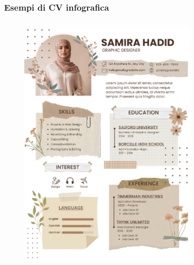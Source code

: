 \documentclass[handout]{beamer}
\begin{document}
\begin{frame}
\frametitle{Esempi di CV infografica}
\begin{columns}
  \begin{column}{.45\textwidth}
    \begin{figure}
      \includegraphics[width=\columnwidth]{img/cv7.png}
    \end{figure} 
  \end{column}
  \begin{column}{.45\textwidth}
    \begin{figure}

\end{figure}
\end{column}
\end{columns}
\end{frame}
\end{document}
